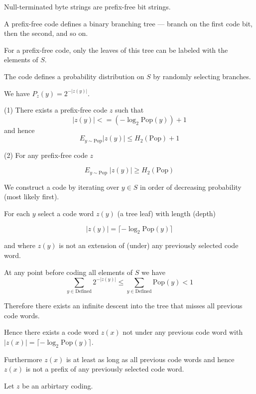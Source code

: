 {\vfill
Null-terminated byte strings are prefix-free bit strings.


A prefix-free code defines a binary branching tree --- branch on the first code bit, then the second, and so on.

\vfill
For a prefix-free code, only the leaves of this tree can be labeled with the elements of $S$.

\vfill
The code defines a probability distribution on $S$ by randomly selecting branches.

\vfill
We have $P_z(y) = 2^{-|z(y)|}$.


(1) There exists a prefix-free code $z$ such that
$$|z(y)| <= (- \log_2 \mathrm{Pop}(y)) + 1$$
and hence
$$E_{y\sim \mathrm{Pop}} |z(y)| \leq H_2(\mathrm{Pop}) +1$$

\vfill
(2) For any prefix-free code $z$

$$E_{y \sim \mathrm{Pop}}\;|z(y)| \geq H_2(\mathrm{Pop})$$


\vfill
We construct a code by iterating over $y \in S$ in order of decreasing probability (most likely first).

\vfill
For each $y$ select a code word $z(y)$ (a tree leaf) with length (depth)

\vfill
$$|z(y)| = \lceil - \log_2 \mathrm{Pop}(y)\rceil$$

\vfill
and where $z(y)$ is not an extension of (under) any previously selected code word.


At any point before coding all elements of $S$ we have
$$\sum_{y \in \mathrm{Defined}} 2^{-|z(y)|} \leq \sum_{y \in \mathrm{Defined}} \mathrm{Pop}(y) < 1$$

\vfill
Therefore there exists an infinite descent into the tree that misses all previous code words.

\vfill
Hence there exists a code word $z(x)$ not under any previous code word with
$|z(x)| = \lceil - \log_2 \mathrm{Pop}(y)\rceil$.

\vfill
Furthermore $z(x)$ is at least as long as all previous code words and hence $z(x)$ is not a prefix of any previously selected code word.


Let $z$ be an arbirtary coding.

}
